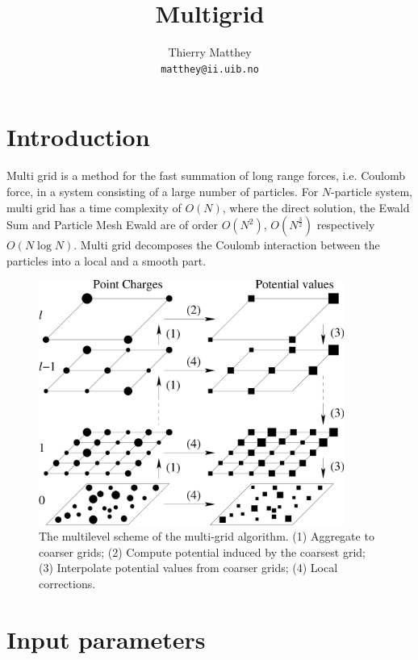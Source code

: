 \documentclass[11pt]{article}
\author{Thierry Matthey\\{\tt matthey@ii.uib.no}}
\title{Multigrid}
\begin{document}
\maketitle

\section{Introduction}

Multi grid is a method for the fast summation of long range forces,
i.e. Coulomb force, in a system consisting of a large number of
particles. For $N$-particle system, multi grid has a time complexity
of $O(N)$, where the direct solution, the Ewald Sum and Particle Mesh
Ewald are of order $O(N^2)$, $O(N^{\frac{3}{2}})$ respectively
$O(N\log N)$. Multi grid decomposes the Coulomb interaction between the
particles into a local and a smooth part.
\begin{figure}[htb]
  \centerline{\includegraphics[width=10cm]{multigrid.pdf}}
  \caption[The multilevel scheme of the multi-grid algorithm.]{\small The
  multilevel scheme of the multi-grid algorithm. (1)
  Aggregate to coarser grids; (2) Compute potential induced by the
  coarsest grid; (3) Interpolate potential values from coarser grids;
  (4) Local corrections.\label{fig:multigrid}}
\end{figure}
\clearpage
\section{Input parameters}
\end{document}
